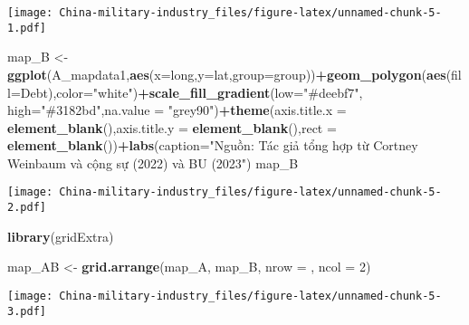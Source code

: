\documentclass[
]{article}
\newenvironment{Shaded}{\begin{snugshade}}{\end{snugshade}}
\newcommand{\AttributeTok}[1]{\textcolor[rgb]{0.13,0.29,0.53}{#1}}
\newcommand{\DecValTok}[1]{\textcolor[rgb]{0.00,0.00,0.81}{#1}}
\newcommand{\FunctionTok}[1]{\textcolor[rgb]{0.13,0.29,0.53}{\textbf{#1}}}
\newcommand{\NormalTok}[1]{#1}
\newcommand{\OtherTok}[1]{\textcolor[rgb]{0.56,0.35,0.01}{#1}}
\newcommand{\SpecialCharTok}[1]{\textcolor[rgb]{0.81,0.36,0.00}{\textbf{#1}}}
\newcommand{\StringTok}[1]{\textcolor[rgb]{0.31,0.60,0.02}{#1}}
\begin{document}
\texttt{[image: China-military-industry\_files/figure-latex/unnamed-chunk-5-1.pdf]}

\begin{Shaded}
\begin{Highlighting}[]
\NormalTok{map\_B }\OtherTok{\textless{}{-}} \FunctionTok{ggplot}\NormalTok{(A\_mapdata1,}\FunctionTok{aes}\NormalTok{(}\AttributeTok{x=}\NormalTok{long,}\AttributeTok{y=}\NormalTok{lat,}\AttributeTok{group=}\NormalTok{group))}\SpecialCharTok{+}\FunctionTok{geom\_polygon}\NormalTok{(}\FunctionTok{aes}\NormalTok{(}\AttributeTok{fill=}\NormalTok{Debt),}\AttributeTok{color=}\StringTok{"white"}\NormalTok{)}\SpecialCharTok{+}\FunctionTok{scale\_fill\_gradient}\NormalTok{(}\AttributeTok{low=}\StringTok{"\#deebf7"}\NormalTok{, }\AttributeTok{high=}\StringTok{"\#3182bd"}\NormalTok{,}\AttributeTok{na.value =} \StringTok{"grey90"}\NormalTok{)}\SpecialCharTok{+}\FunctionTok{theme}\NormalTok{(}\AttributeTok{axis.title.x =} \FunctionTok{element\_blank}\NormalTok{(),}\AttributeTok{axis.title.y =} \FunctionTok{element\_blank}\NormalTok{(),}\AttributeTok{rect =} \FunctionTok{element\_blank}\NormalTok{())}\SpecialCharTok{+}\FunctionTok{labs}\NormalTok{(}\AttributeTok{caption=}\StringTok{"Nguồn: Tác giả tổng hợp từ Cortney Weinbaum và cộng sự (2022) và BU (2023"}\NormalTok{)}
\NormalTok{map\_B}
\end{Highlighting}
\end{Shaded}

\texttt{[image: China-military-industry\_files/figure-latex/unnamed-chunk-5-2.pdf]}

\begin{Shaded}
\begin{Highlighting}[]
\FunctionTok{library}\NormalTok{(gridExtra)}

\NormalTok{map\_AB }\OtherTok{\textless{}{-}} \FunctionTok{grid.arrange}\NormalTok{(map\_A, map\_B, }\AttributeTok{nrow =}\NormalTok{ , }\AttributeTok{ncol =} \DecValTok{2}\NormalTok{)}
\end{Highlighting}
\end{Shaded}

\texttt{[image: China-military-industry\_files/figure-latex/unnamed-chunk-5-3.pdf]}
\end{document}
